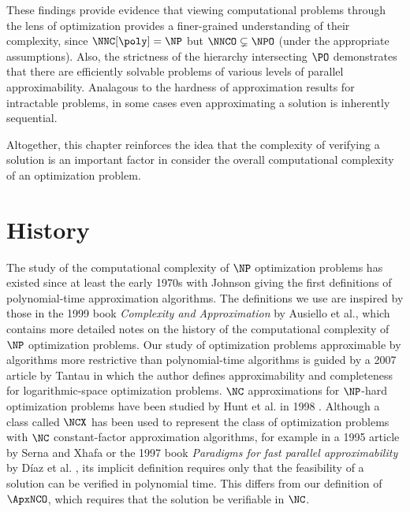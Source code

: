 %
%
%
These findings provide evidence that viewing computational problems through the lens of optimization provides a finer-grained understanding of their complexity, since $\NNC[\poly] = \NP$ but $\NNCO \subsetneq \NPO$ (under the appropriate assumptions).
Also, the strictness of the hierarchy intersecting $\PO$ demonstrates that there are efficiently solvable problems of various levels of parallel approximability.
Analagous to the hardness of approximation results for intractable problems, in some cases even approximating a solution is inherently sequential.

%
%
Altogether, this chapter reinforces the idea that the complexity of verifying a solution is an important factor in consider the overall computational complexity of an optimization problem.

\section{History}

The study of the computational complexity of $\NP$ optimization problems has existed since at least the early 1970s with Johnson \autocite{johnson74} giving the first definitions of polynomial-time approximation algorithms.
The definitions we use are inspired by those in the 1999 book \emph{Complexity and Approximation} by Ausiello et al., which contains more detailed notes on the history of the computational complexity of $\NP$ optimization problems.
Our study of optimization problems approximable by algorithms more restrictive than polynomial-time algorithms is guided by a 2007 article by Tantau \autocite{tantau07} in which the author defines approximability and completeness for logarithmic-space optimization problems.
$\NC$ approximations for $\NP$-hard optimization problems have been studied by Hunt et al. in 1998 \autocite{hmrrrs98}.
Although a class called $\NCX$ has been used to represent the class of optimization problems with $\NC$ constant-factor approximation algorithms, for example in a 1995 article by Serna and Xhafa \autocite{sx95} or the 1997 book \emph{Paradigms for fast parallel approximability} by Díaz et al. \autocite{dsst97}, its implicit definition requires only that the feasibility of a solution can be verified in polynomial time.
This differs from our definition of $\ApxNCO$, which requires that the solution be verifiable in $\NC$.

